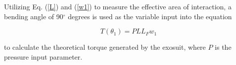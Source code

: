 Utilizing Eq. (\ref{L}) and (\ref{w1}) to measure the effective area of interaction, a bending angle of 90$^{\circ}$ degrees is used as the variable input into the equation 

\begin{equation}\label{torque}
	T(\theta_1) = PLL_Fw_1
\end{equation}

to calculate the theoretical torque generated by the exosuit, where $P$ is the pressure input parameter. 




